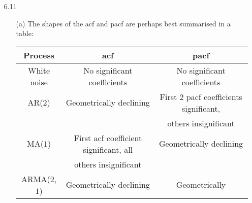 \documentclass[11pt,a4paper]{article}
\begin{document}
\begin{itemize}
\begin{itemize}
%
\end{itemize}
\item[6.11]
\begin{itemize}
\item[(a)]
The shapes of the acf and pacf are perhaps best summarised in a table: \\
\begin{tabular}{c|cc}
\hline
Process & acf & pacf\\
\hline
White noise & No significant coefficients & No significant
coefficients \\
AR($2$) & Geometrically declining& First 2 pacf coefficients
significant, \\
 & & others insignificant \\
MA($1$) & First acf coefficient
significant, all & Geometrically declining\\
 & others insignificant &\\
ARMA($2$,$1$) & Geometrically declining& Geometrically

\end{tabular}
\end{itemize}
\end{itemize}
\end{document}
